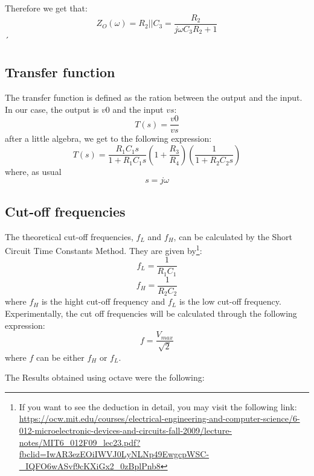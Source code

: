Therefore we get that:
\begin{equation}
 Z_O(\omega) = R_2 || C_3 = \frac{R_2}{j\omega C_3 R_2 + 1}  
\end{equation}
´
\subsection{Transfer function}
The transfer function is defined as the ration between the output and the input. In our case, the output is $v0$ and the input $vs$:
\begin{equation*}
    T(s)=\frac{v0}{vs}
\end{equation*}
after a little algebra, we get to the following expression:
\begin{equation}
    T(s)=\frac{R_{1}C_{1}s}{1+R_{1}C_{1}s} (1 + \frac{R_{3}}{R_4}) (\frac{1}{1+ R_{2} C_{2}s}) 
\end{equation}
where, as usual
\begin{equation*}
    s = j\omega
\end{equation*}

\subsection{Cut-off frequencies}
The theoretical cut-off frequencies, $f_L$ and $f_H$, can be calculated by the Short Circuit Time Constants Method. They are given by\footnote{If you want to see the deduction in detail, you may visit the following link: \url{https://ocw.mit.edu/courses/electrical-engineering-and-computer-science/6-012-microelectronic-devices-and-circuits-fall-2009/lecture-notes/MIT6_012F09_lec23.pdf?fbclid=IwAR3ezEOiIWVJ0LyNLNp49EwgcpWSC-_IQFO6wASvf9cKXiGx2_0zBplPnb8}}:
\begin{equation}
    f_L = \frac{1}{R_1C_1}
\end{equation}
\begin{equation}
    f_H = \frac{1}{R_2C_2}
\end{equation}
where $f_H$ is the hight cut-off frequency and $f_L$ is the low cut-off frequency.
Experimentally, the cut off frequencies will be calculated through the following expression:
\begin{equation*}
    f = \frac{V_{max}}{\sqrt{2}}
\end{equation*}
where $f$ can be either $f_H$ or $f_L$.


The Results obtained using octave were the following:


